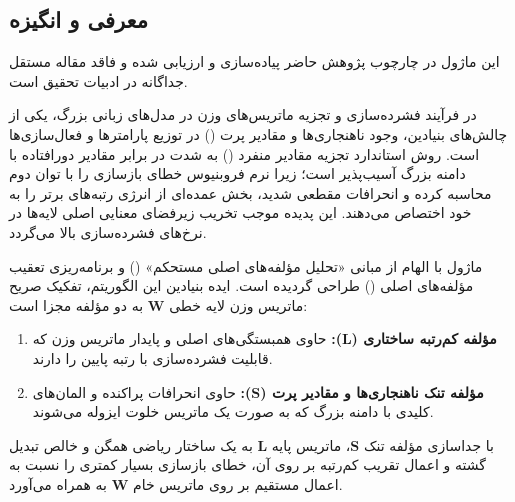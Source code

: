 \subsection{معرفی و انگیزه}
این ماژول در چارچوب پژوهش حاضر پیاده‌سازی و ارزیابی شده و فاقد مقاله مستقل جداگانه در ادبیات تحقیق است.

در فرآیند فشرده‌سازی و تجزیه ماتریس‌های وزن در مدل‌های زبانی بزرگ، یکی از چالش‌های بنیادین، وجود ناهنجاری‌ها و مقادیر پرت () در توزیع پارامترها و فعال‌سازی‌ها است. روش استاندارد تجزیه مقادیر منفرد () به شدت در برابر مقادیر دورافتاده با دامنه بزرگ آسیب‌پذیر است؛ زیرا نرم فروبنیوس خطای بازسازی را با توان دوم محاسبه کرده و انحرافات مقطعی شدید، بخش عمده‌ای از انرژی رتبه‌های برتر  را به خود اختصاص می‌دهند. این پدیده موجب تخریب زیرفضای معنایی اصلی لایه‌ها در نرخ‌های فشرده‌سازی بالا می‌گردد.

ماژول  با الهام از مبانی «تحلیل مؤلفه‌های اصلی مستحکم» () و برنامه‌ریزی تعقیب مؤلفه‌های اصلی () طراحی گردیده است. ایده بنیادین این الگوریتم، تفکیک صریح ماتریس وزن لایه خطی $\mathbf{W}$ به دو مؤلفه مجزا است:
\begin{enumerate}
    \item \textbf{مؤلفه کم‌رتبه ساختاری ($\mathbf{L}$):} حاوی همبستگی‌های اصلی و پایدار ماتریس وزن که قابلیت فشرده‌سازی با رتبه پایین را دارند.
    \item \textbf{مؤلفه تنک ناهنجاری‌ها و مقادیر پرت ($\mathbf{S}$):} حاوی انحرافات پراکنده و المان‌های کلیدی با دامنه بزرگ که به صورت یک ماتریس خلوت ایزوله می‌شوند.
\end{enumerate}
با جداسازی مؤلفه تنک $\mathbf{S}$، ماتریس پایه $\mathbf{L}$ به یک ساختار ریاضی همگن و خالص تبدیل گشته و اعمال تقریب کم‌رتبه بر روی آن، خطای بازسازی بسیار کمتری را نسبت به اعمال مستقیم  بر روی ماتریس خام $\mathbf{W}$ به همراه می‌آورد.
